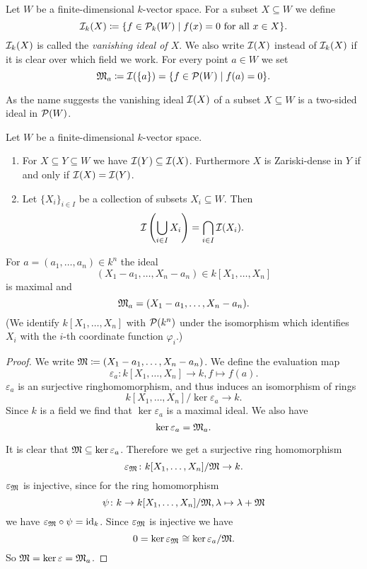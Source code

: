 \begin{defi}
 Let $W$ be a finite-dimensional $k$-vector space. For a subset $X \subseteq W$ we define
 \[
  \mathcal{I}_k(X) \coloneqq \{ f \in \mathcal{P}_k(W) \mid f(x) = 0 \text{ for all } x \in X \}.
 \]
 $\mathcal{I}_k(X)$ is called the \emph{vanishing ideal of $X$}. We also write $\mathcal{I}(X)$ instead of $\mathcal{I}_k(X)$ if it is clear over which field we work.
 For every point $a \in W$ we set
 \[
  \mathfrak{M}_a \coloneqq \mathcal{I}(\{a\}) = \{f \in \mathcal{P}(W) \mid f(a) = 0\}.
 \]
\end{defi}


\begin{rem}
 As the name suggests the vanishing ideal $\mathcal{I}(X)$ of a subset $X \subseteq W$ is a two-sided ideal in $\mathcal{P}(W)$.
\end{rem}


\begin{rem}
 Let $W$ be a finite-dimensional $k$-vector space.
 \begin{enumerate}[label=\emph{\alph*)},leftmargin=*]
  \item
   For $X \subseteq Y \subseteq W$ we have $\mathcal{I}(Y) \subseteq \mathcal{I}(X)$. Furthermore $X$ is Zariski-dense in $Y$ if and only if $\mathcal{I}(X) = \mathcal{I}(Y)$.
  \item
   Let $\{X_i\}_{i \in I}$ be a collection of subsets $X_i \subseteq W$. Then
   \[
    \mathcal{I}\left( \bigcup_{i \in I} X_i \right) = \bigcap_{i \in I} \mathcal{I}(X_i).
   \]
 \end{enumerate}
\end{rem}


\begin{lem}
 For $a = (a_1, \dotsc, a_n) \in k^n$ the ideal
 \[
  (X_1 - a_1, \dotsc, X_n - a_n) \in k[X_1, \dotsc, X_n]
 \]
 is maximal and
 \[
  \mathfrak{M}_a = (X_1 - a_1, \dotsc, X_n - a_n).
 \]
 (We identify $k[X_1, \dotsc, X_n]$ with $\mathcal{P}(k^n)$ under the isomorphism which identifies $X_i$ with the $i$-th coordinate function $\varphi_i$.)
\end{lem}
\begin{proof}
 We write $\mathfrak{M} \coloneqq (X_1 - a_1, \dotsc, X_n - a_n)$. We define the evaluation map
 \[
  \varepsilon_a \colon k[X_1, \dotsc, X_n] \to k, f \mapsto f(a).
 \]
 $\varepsilon_a$ is an surjective ringhomomorphism, and thus induces an isomorphism of rings
 \[
  k[X_1, \dotsc, X_n]/\ker \varepsilon_a \to k.
 \]
 Since $k$ is a field we find that $\ker \varepsilon_a$ is a maximal ideal. We also have
 \[
  \ker \varepsilon_a = \mathfrak{M}_a.
 \]
 
 It is clear that $\mathfrak{M} \subseteq \ker \varepsilon_a$. Therefore we get a surjective ring homomorphism
 \[
  \varepsilon_\mathfrak{M} \colon k[X_1, \dotsc, X_n]/\mathfrak{M} \to k.
 \]
 $\varepsilon_\mathfrak{M}$ is injective, since for the ring homomorphism
 \[
  \psi \colon k \to k[X_1, \dotsc, X_n]/\mathfrak{M}, \lambda \mapsto \lambda + \mathfrak{M}
 \]
 we have $\varepsilon_\mathfrak{M} \circ \psi = \operatorname{id}_k$. Since $\varepsilon_\mathfrak{M}$ is injective we have
 \[
  0 = \ker \varepsilon_\mathfrak{M} \cong \ker \varepsilon_a / \mathfrak{M}.
 \]
 So $\mathfrak{M} = \ker \varepsilon = \mathfrak{M}_a$.
\end{proof}

